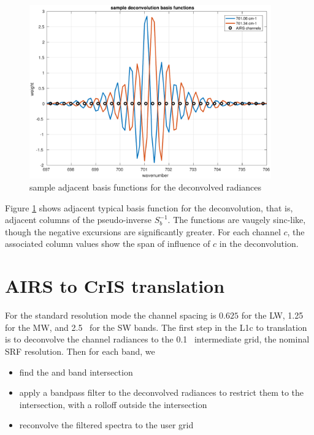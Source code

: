 \documentclass[11pt]{article}
\begin{document}
\begin{figure} %
  \centering
  \includegraphics[height=7.5cm]{figures/airs_decon_basis.pdf}
  \caption{sample adjacent basis functions for the deconvolved
    {\airs} radiances}
  \label{dbasis}
\end{figure}

Figure \ref{dbasis} shows adjacent typical basis function for
the deconvolution, that is, adjacent columns of the pseudo-inverse
$S_b^{-1}$.  The functions are vaugely sinc-like, though the negative
excursions are significantly greater.  For each channel $c$, the
associated column values show the span of influence of $c$ in the
deconvolution.

\FloatBarrier
\section{AIRS to CrIS translation}
\label{airs2cris}

For the {\cris} standard resolution mode the channel spacing is
$0.625$ {\wn} for the LW, 1.25~{\wn} for the MW, and 2.5~{\wn} for
the SW bands.  The first step in the {\airs} L1c to {\cris}
translation is to deconvolve the {\airs} channel radiances to the
0.1~{\wn} intermediate grid, the nominal {\airs} SRF resolution.
Then for each {\cris} band, we

\begin{itemize}
  \item find the {\airs} and {\cris} band intersection

  \item apply a bandpass filter to the deconvolved {\airs} radiances
    to restrict them to the intersection, with a rolloff outside the
    intersection

  \item reconvolve the filtered spectra to the {\cris} user grid

\end{itemize}
\end{document}
